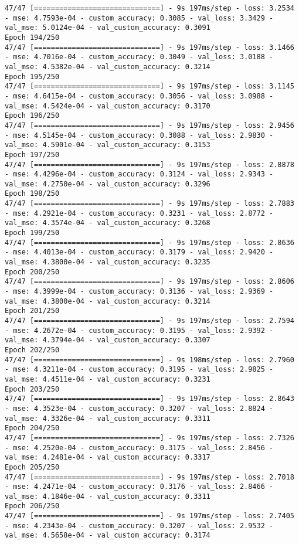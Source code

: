 \begin{lstlisting}
47/47 [==============================] - 9s 197ms/step - loss: 3.2534 - mse: 4.7593e-04 - custom_accuracy: 0.3085 - val_loss: 3.3429 - val_mse: 5.0124e-04 - val_custom_accuracy: 0.3091
Epoch 194/250
47/47 [==============================] - 9s 197ms/step - loss: 3.1466 - mse: 4.7016e-04 - custom_accuracy: 0.3049 - val_loss: 3.0188 - val_mse: 4.5382e-04 - val_custom_accuracy: 0.3214
Epoch 195/250
47/47 [==============================] - 9s 197ms/step - loss: 3.1145 - mse: 4.6415e-04 - custom_accuracy: 0.3056 - val_loss: 3.0988 - val_mse: 4.5424e-04 - val_custom_accuracy: 0.3170
Epoch 196/250
47/47 [==============================] - 9s 197ms/step - loss: 2.9456 - mse: 4.5145e-04 - custom_accuracy: 0.3088 - val_loss: 2.9830 - val_mse: 4.5901e-04 - val_custom_accuracy: 0.3153
Epoch 197/250
47/47 [==============================] - 9s 197ms/step - loss: 2.8878 - mse: 4.4296e-04 - custom_accuracy: 0.3124 - val_loss: 2.9343 - val_mse: 4.2750e-04 - val_custom_accuracy: 0.3296
Epoch 198/250
47/47 [==============================] - 9s 197ms/step - loss: 2.7883 - mse: 4.2921e-04 - custom_accuracy: 0.3231 - val_loss: 2.8772 - val_mse: 4.3574e-04 - val_custom_accuracy: 0.3268
Epoch 199/250
47/47 [==============================] - 9s 197ms/step - loss: 2.8636 - mse: 4.4013e-04 - custom_accuracy: 0.3179 - val_loss: 2.9420 - val_mse: 4.3800e-04 - val_custom_accuracy: 0.3235
Epoch 200/250
47/47 [==============================] - 9s 197ms/step - loss: 2.8606 - mse: 4.3999e-04 - custom_accuracy: 0.3136 - val_loss: 2.9369 - val_mse: 4.3800e-04 - val_custom_accuracy: 0.3214
Epoch 201/250
47/47 [==============================] - 9s 197ms/step - loss: 2.7594 - mse: 4.2672e-04 - custom_accuracy: 0.3195 - val_loss: 2.9392 - val_mse: 4.3794e-04 - val_custom_accuracy: 0.3307
Epoch 202/250
47/47 [==============================] - 9s 198ms/step - loss: 2.7960 - mse: 4.3211e-04 - custom_accuracy: 0.3195 - val_loss: 2.9825 - val_mse: 4.4511e-04 - val_custom_accuracy: 0.3231
Epoch 203/250
47/47 [==============================] - 9s 197ms/step - loss: 2.8643 - mse: 4.3523e-04 - custom_accuracy: 0.3207 - val_loss: 2.8824 - val_mse: 4.3326e-04 - val_custom_accuracy: 0.3311
Epoch 204/250
47/47 [==============================] - 9s 197ms/step - loss: 2.7326 - mse: 4.2520e-04 - custom_accuracy: 0.3175 - val_loss: 2.8456 - val_mse: 4.2481e-04 - val_custom_accuracy: 0.3317
Epoch 205/250
47/47 [==============================] - 9s 197ms/step - loss: 2.7018 - mse: 4.2471e-04 - custom_accuracy: 0.3176 - val_loss: 2.8466 - val_mse: 4.1846e-04 - val_custom_accuracy: 0.3311
Epoch 206/250
47/47 [==============================] - 9s 197ms/step - loss: 2.7405 - mse: 4.2343e-04 - custom_accuracy: 0.3207 - val_loss: 2.9532 - val_mse: 4.5658e-04 - val_custom_accuracy: 0.3174

\end{lstlisting}

